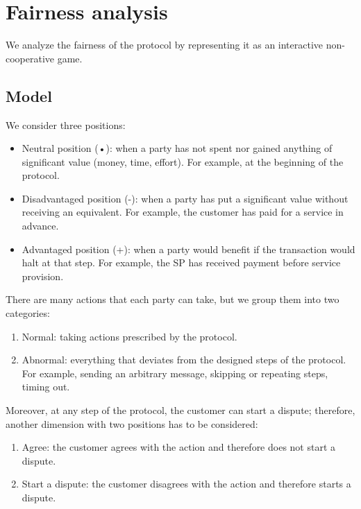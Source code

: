 \documentclass{ieeeaccess}
\begin{document}
\section{Fairness analysis}\label{sec:fairness-analysis}

We analyze the fairness of the protocol by representing it as an interactive non-cooperative game.

\subsection{Model}\label{model}
We consider three positions:

\begin{itemize}
\item Neutral position (•): when a party has not spent nor gained anything of significant value (money, time, effort). For example, at the beginning of the protocol.
\item Disadvantaged position (-): when a party has put a significant value without receiving an equivalent. For example, the customer has paid for a service in advance.
\item Advantaged position (+): when a party would benefit if the transaction would halt at that step. For example, the SP has received payment before service provision.
\end{itemize}

There are many actions that each party can take, but we group them into two categories:

\begin{enumerate}
\def\labelenumi{\arabic{enumi}.}

\item Normal: taking actions prescribed by the protocol.
\item Abnormal: everything that deviates from the designed steps of the protocol. For example, sending an arbitrary message, skipping or repeating steps, timing out.
\end{enumerate}

Moreover, at any step of the protocol, the customer can start a dispute; therefore, another dimension with two positions has to be considered:

\begin{enumerate}
\def\labelenumi{\arabic{enumi}.}

\item Agree: the customer agrees with the action and therefore does not start a dispute.
\item Start a dispute: the customer disagrees with the action and therefore starts a dispute.
\end{enumerate}
\end{document}
